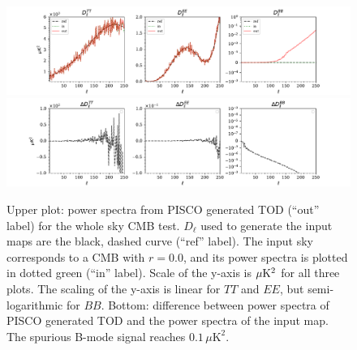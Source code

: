 \documentclass[a4paper,11pt]{article}
\begin{document}
\begin{figure}
	\centering
	\includegraphics[width=1\textwidth, trim = {2.2cm 0.0cm 2.3cm 0.0cm}, clip ]{figures/whole_sky_random_offsets.pdf}
	\includegraphics[width=1\textwidth, trim = {2.2cm 0.0cm 2.3cm 0.0cm}, clip ]{figures/whole_sky_random_offsets_residuals.pdf}
	\caption{Upper plot: power spectra from PISCO generated TOD (``out'' label) for the whole sky CMB test. $D_\ell$ used to generate the input maps are the black, dashed curve (``ref'' label). The input sky corresponds to a CMB with $r=0.0$, and its power spectra is plotted in dotted green (``in'' label). Scale of the y-axis is $\mu\rm{K}^2$ for all three plots. The scaling of the y-axis is linear for $TT$ and $EE$, but semi-logarithmic for $BB$.  Bottom: difference between power spectra of PISCO generated TOD and the power spectra of the input map. The spurious B-mode signal reaches $0.1 \, \mu\mathrm{K}^2$.}
	\label{fig::pisco4wholesky_random_offsets}
\end{figure}
\end{document}
